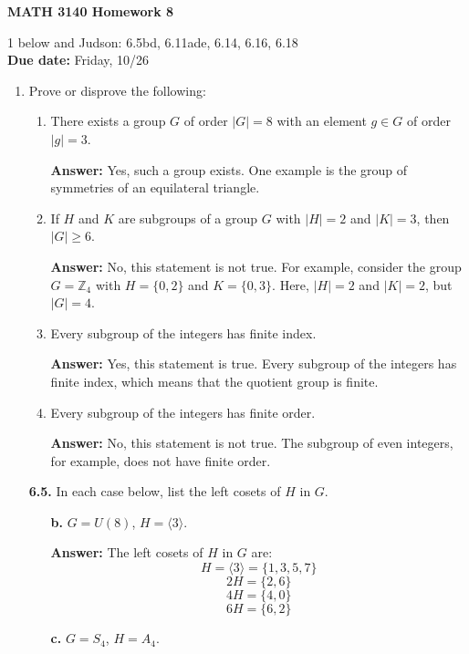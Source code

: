 \documentclass[12pt,reqno]{amsart}
\newcommand{\subject}{MATH\xspace}
\newcommand{\coursenumber}{3140\xspace}
\newcommand{\probskip}{\vskip1cm}
\begin{document}
\thispagestyle{empty}

\noindent \textbf{\subject \coursenumber Homework 8}

\medskip

 1 below and Judson: 6.5bd, 6.11ade, 6.14, 6.16, 6.18\\
{\bf Due date:} Friday, 10/26

\bigskip

\begin{enumerate}[{\bf 1.}]

\item
Prove or disprove the following: 
\begin{enumerate}
\item 
There exists a group $G$ of order $|G| = 8$ with an element
$g \in G$ of order $|g|=3$.

\textbf{Answer:} Yes, such a group exists. One example is the group of symmetries of an equilateral triangle.

\item
If $H$ and $K$ are subgroups of a group $G$ with $|H|=2$ and $|K|=3$, 
  then $|G|\geq 6$.

\textbf{Answer:} No, this statement is not true. For example, consider the group $G = \mathbb{Z}_4$ with $H = \{0, 2\}$ and $K = \{0, 3\}$. Here, $|H| = 2$ and $|K| = 2$, but $|G| = 4$.

\item
Every subgroup of the integers has finite index.

\textbf{Answer:} Yes, this statement is true. Every subgroup of the integers has finite index, which means that the quotient group is finite.

\item 
Every subgroup of the integers has finite order.

\textbf{Answer:} No, this statement is not true. The subgroup of even integers, for example, does not have finite order.
\end{enumerate}
\probskip

\item[{\bf 6.5.}]
In each case below, list the left cosets of $H$ in $G$.
\begin{enumerate}
\item[{\bf b.}]
$G = U(8)$, $H = \langle 3 \rangle$.

\textbf{Answer:} The left cosets of $H$ in $G$ are:
\[
H = \langle 3 \rangle = \{1, 3, 5, 7\}
\]
\[
2H = \{2, 6\}
\]
\[
4H = \{4, 0\}
\]
\[
6H = \{6, 2\}
\]
\item[{\bf c.}]
$G = S_4$, $H = A_4$.


\end{enumerate}
\end{enumerate}
\end{document}
